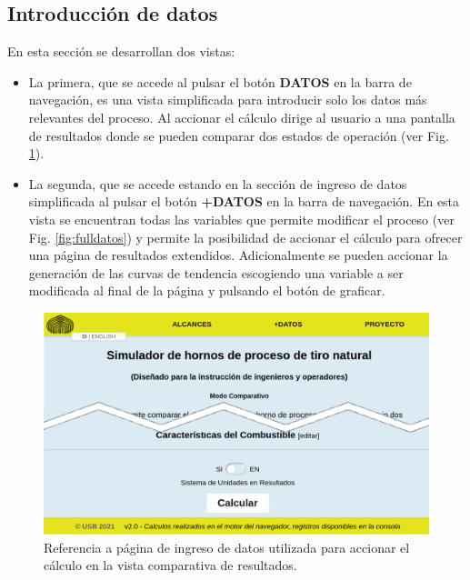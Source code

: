 \subsection{Introducción de datos}
\par En esta sección se desarrollan dos vistas:
\begin{itemize}
    \item La primera, que se accede al pulsar el botón \textbf{DATOS} en la barra de navegación, es una vista simplificada para introducir solo los datos más relevantes del proceso. Al accionar el cálculo dirige al usuario a una pantalla de resultados donde se pueden comparar dos estados de operación (ver Fig. \ref{fig:datos}).
    \item La segunda, que se accede estando en la sección de ingreso de datos simplificada al pulsar el botón \textbf{+DATOS} en la barra de navegación. En esta vista se encuentran todas las variables que permite modificar el proceso (ver Fig. \ref{fig:fulldatos}) y permite la posibilidad de accionar el cálculo para ofrecer una página de resultados extendidos. Adicionalmente se pueden accionar la generación de las curvas de tendencia escogiendo una variable a ser modificada al final de la página y pulsando el botón de graficar.
\end{itemize}
\begin{figure}[H]
\begin{center}
\includegraphics[scale=0.3]{images/datos}
\caption[Página de ingreso de datos para comparación]{Referencia a página de ingreso de datos utilizada para accionar el cálculo en la vista comparativa de resultados.}
\label{fig:datos}
\end{center}
\end{figure}
